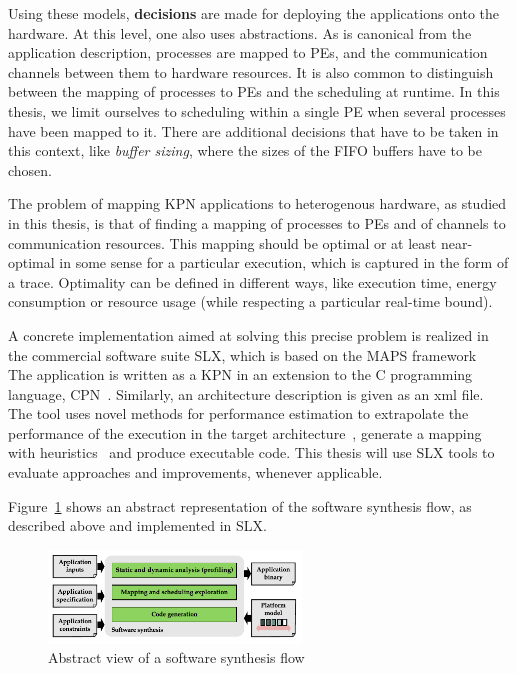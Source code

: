\documentclass{article}
\begin{document}
Using these models, \textbf{decisions} are made for deploying the applications onto the hardware. At this level,
one also uses abstractions. As is canonical from the application description, processes are mapped to PEs, 
and the communication channels between them to hardware resources. It is also common to distinguish between the mapping of
processes to PEs and the scheduling at runtime.
In this thesis, we limit ourselves to scheduling within a single PE when several processes have been mapped to it.
There are additional decisions that have to be taken in this context, like \emph{buffer sizing}, where the sizes of the
FIFO buffers have to be chosen. 

The problem of mapping KPN applications to heterogenous hardware, as studied in this thesis, is that of
finding a mapping of processes to PEs and of channels to communication resources. 
This mapping should be optimal or at least near-optimal in some sense for a particular execution, which is captured in the form of a trace.
Optimality can be defined in different ways, like execution time, energy consumption or resource usage (while respecting a particular real-time bound).

A concrete implementation aimed at solving this precise problem is realized in the commercial software suite SLX, which is based on the MAPS framework~\cite{castrillon_maps,castrillon_springer}
The application is written as a KPN in an extension to the C programming language, CPN~\cite{ceng_cpn}. Similarly, an architecture description is given as an xml file.
The tool uses novel methods for performance estimation to extrapolate the performance of the execution in the target architecture~\cite{eusse}, generate a mapping with heuristics~\cite{castrillon_dac12,castrillon_industrial_informatics} and produce executable code.
This thesis will use SLX tools to evaluate approaches and improvements, whenever applicable.

Figure~\ref{fig:synthesisflow} shows an abstract representation of the software synthesis flow, as described above and implemented in SLX.
\begin{figure}[h]
	\centering
	\includegraphics[width=0.60\textwidth]{figures/synthesisflow.pdf}
	\caption{Abstract view of a software synthesis flow}
	\label{fig:synthesisflow}
\end{figure}
\end{document}
